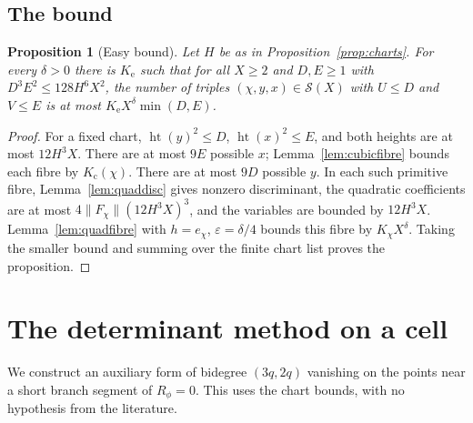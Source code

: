 \documentclass[11pt,reqno]{amsart}
\newtheorem{proposition}[theorem]{Proposition}
\theoremstyle{definition}
\theoremstyle{remark}
\numberwithin{equation}{section}
\newcommand{\eps}{\varepsilon}\newcommand{\card}{\#}
\newcommand{\hgt}{\operatorname{ht}}
\begin{document}
\subsection{The bound}
\begin{proposition}[Easy bound]\label{prop:easy}
Let $H$ be as in Proposition~\ref{prop:charts}. For every
$\delta>0$ there is $K_{\mathrm e}$ such that for all $X\ge2$ and
$D,E\ge1$ with $D^3E^2\le128H^6X^2$, the number of triples
$(\chi,y,x)\in\mathcal S(X)$ with $U\le D$ and $V\le E$ is at most
$K_{\mathrm e}X^{\delta}\min(D,E)$.
\end{proposition}
\begin{proof}
For a fixed chart, $\hgt(y)^2\le D$, $\hgt(x)^2\le E$, and both
heights are at most $12H^3X$. There are at most $9E$ possible $x$;
Lemma~\ref{lem:cubicfibre} bounds each fibre by $K_{\mathrm c}(\chi)$.
There are at most $9D$ possible $y$. In each such primitive fibre,
Lemma~\ref{lem:quaddisc} gives nonzero discriminant, the quadratic
coefficients are at most $4\|F_\chi\|(12H^3X)^3$, and the variables
are bounded by $12H^3X$. Lemma~\ref{lem:quadfibre} with
$h=e_\chi$, $\eps=\delta/4$ bounds this fibre by $K_\chi X^\delta$.
Taking the smaller bound and summing over the finite chart list proves
the proposition.
\end{proof}
\section{The determinant method on a cell}\label{sec:det}
We construct an auxiliary form of bidegree $(3q,2q)$ vanishing on the
points near a short branch segment of $R_\phi=0$. This uses the chart
bounds, with no hypothesis from the literature.
\end{document}
